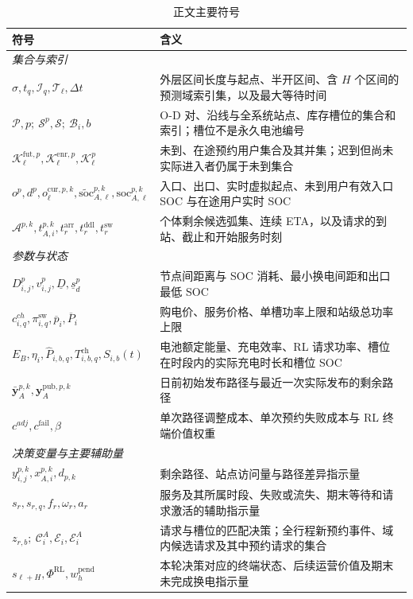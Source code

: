 \documentclass[12pt,a4paper,UTF8]{ctexart}
\begin{document}
\begin{table}[!htbp]
  \centering
  \caption{正文主要符号}
  \label{tab:notation}
  \small
  \setlength{\tabcolsep}{3pt}
  \renewcommand{\arraystretch}{0.98}
  \begin{tabular}{@{}lp{11cm}@{}}
    \toprule
    \textbf{符号} & \textbf{含义} \\
    \midrule
    \multicolumn{2}{l}{\textit{集合与索引}} \\
    $\sigma,t_q,\mathcal I_q,\mathcal T_\ell,\Delta t$ & 外层区间长度与起点、半开区间、含 $H$ 个区间的预测域索引集，以及最大等待时间 \\
    $\mathcal P,p;\ \mathcal S^p,\mathcal S;\ \mathcal B_i,b$ & O-D 对、沿线与全系统站点、库存槽位的集合和索引；槽位不是永久电池编号 \\
    $\mathcal K_\ell^{\mathrm{fut},p},\mathcal K_\ell^{\mathrm{enr},p},\mathcal K_\ell^p$ & 未到、在途预约用户集合及其并集；迟到但尚未实际进入者仍属于未到集合 \\
    $o^p,d^p,o_\ell^{\mathrm{cur},p,k},\widetilde{\mathrm{soc}}_{A,\ell}^{p,k},\mathrm{soc}_{A,\ell}^{p,k}$ & 入口、出口、实时虚拟起点、未到用户有效入口 SOC 与在途用户实时 SOC \\
    $\mathcal A^{p,k},t_{A,i}^{p,k},t_r^{\mathrm{arr}},t_r^{\mathrm{ddl}},t_r^{\mathrm{sw}}$ & 个体剩余候选弧集、连续 ETA，以及请求的到站、截止和开始服务时刻 \\
    \midrule
    \multicolumn{2}{l}{\textit{参数与状态}} \\
    $D_{i,j}^{p},v_{i,j}^{p},\underline D,\underline s_d^p$ & 节点间距离与 SOC 消耗、最小换电间距和出口最低 SOC \\
    $c^{ch}_{i,q},\pi_{i,q}^{\mathrm{sw}},\overline p_i,\overline P_i$ & 购电价、服务价格、单槽功率上限和站级总功率上限 \\
    $E_B,\eta_i,\widehat P_{i,b,q},T_{i,b,q}^{\mathrm{ch}},S_{i,b}(t)$ & 电池额定能量、充电效率、RL 请求功率、槽位在时段内的实际充电时长和槽位 SOC \\
    $\bar{\mathbf y}_{A}^{p,k},\mathbf y_{A}^{\mathrm{pub},p,k}$ & 日前初始发布路径与最近一次实际发布的剩余路径 \\
    $c^{adj},c^{\mathrm{fail}},\beta$ & 单次路径调整成本、单次预约失败成本与 RL 终端价值权重 \\
    \midrule
    \multicolumn{2}{l}{\textit{决策变量与主要辅助量}} \\
    $y_{i,j}^{p,k},x_{A,i}^{p,k},d_{p,k}$ & 剩余路径、站点访问量与路径差异指示量 \\
    $s_r,s_{r,q},f_r,\omega_r,a_r$ & 服务及其所属时段、失败或流失、期末等待和请求激活的辅助指示量 \\
    $z_{r,b};\ \mathcal C_i^A,\mathcal E_i,\mathcal E_i^A$ & 请求与槽位的匹配决策；全行程新预约事件、域内候选请求及其中预约请求的集合 \\
    $s_{\ell+H},\Phi^{\mathrm{RL}},w_h^{\mathrm{pend}}$ & 本轮决策对应的终端状态、后续运营价值及期末未完成换电指示量 \\
    \bottomrule
  \end{tabular}
\end{table}
\end{document}
